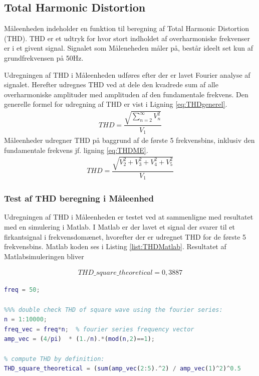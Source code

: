 
\subsection{Total Harmonic Distortion}

Måleenheden indeholder en funktion til beregning af Total Harmonic Distortion (THD). THD er et udtryk for hvor stort indholdet af overharmoniske frekvenser er i et givent signal. Signalet som Måleneheden måler på, består ideelt set kun af grundfrekvensen på 50Hz. 

Udregningen af THD i Måleenheden udføres efter der er lavet Fourier analyse af signalet. Herefter udregnes THD ved at dele den kvadrede sum af alle overharmoniske amplituder med amplituden af den fundamentale frekvens. Den generelle formel for udregning af THD er vist i Ligning \ref{eq:THDgenerel}.
\begin{align}
	THD = \dfrac{\sqrt{\sum_{n=2}^{\infty}V_n^{2}}}{V_{1}}
	\label{eq:THDgenerel}
\end{align}
Måleenheder udregner THD på baggrund af de første 5 frekvensbins, inklusiv den fundamentale frekvens jf. ligning \ref{eq:THDME}.
\begin{align}
THD = \dfrac{\sqrt{V_2^{2}+V_3^{2}+V_4^{2}+V_5^{2}}}{V_{1}}
\label{eq:THDME}
\end{align}

\subsubsection{Test af THD beregning i Måleenhed}
\label{sek:THD}


Udregningen af THD i Måleenheden er testet ved at sammenligne med resultatet med en simulering i Matlab. I Matlab er der lavet et signal der svarer til et firkantsignal i frekvensdomænet, hvorefter der er udregnet THD for de første 5 frekvensbins. Matlab koden ses i Listing \ref{list:THDMatlab}. Resultatet af Matlabsimuleringen bliver

\begin{align}
	THD\_square\_theoretical = 0,3887
\end{align}



\begin{lstlisting}[language=Matlab] 
freq = 50;

%%% double check THD of square wave using the fourier series:
n = 1:10000;
freq_vec = freq*n;  % fourier series frequency vector
amp_vec = (4/pi)  * (1./n).*(mod(n,2)==1);

% compute THD by definition:
THD_square_theoretical = (sum(amp_vec(2:5).^2) / amp_vec(1)^2)^0.5
\end{lstlisting}



